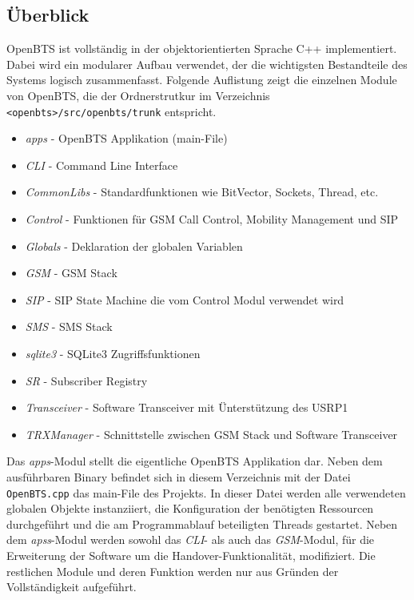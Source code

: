 \label{sec:swarch}

\subsection{Überblick}

OpenBTS ist vollständig in der objektorientierten Sprache C++ implementiert. Dabei wird ein modularer Aufbau verwendet, der die wichtigsten Bestandteile des Systems logisch zusammenfasst. Folgende Auflistung zeigt die einzelnen Module von OpenBTS, die der Ordnerstrutkur im Verzeichnis \lstinline{<openbts>/src/openbts/trunk} entspricht.

\begin{itemize}
 \item \textit{apps} - OpenBTS Applikation (main-File)
 \item \textit{CLI} - Command Line Interface
 \item \textit{CommonLibs} - Standardfunktionen wie BitVector, Sockets, Thread, etc.
 \item \textit{Control} - Funktionen für GSM Call Control, Mobility Management und SIP
 \item \textit{Globals} - Deklaration der globalen Variablen
 \item \textit{GSM} - GSM Stack
 \item \textit{SIP} - SIP State Machine die vom Control Modul verwendet wird
 \item \textit{SMS} - SMS Stack
 \item \textit{sqlite3} - SQLite3 Zugriffsfunktionen
 \item \textit{SR} - Subscriber Registry
 \item \textit{Transceiver} - Software Transceiver mit Ünterstützung des USRP1
 \item \textit{TRXManager} - Schnittstelle zwischen GSM Stack und Software Transceiver
\end{itemize}

Das \textit{apps}-Modul stellt die eigentliche OpenBTS Applikation dar. Neben dem ausführbaren Binary befindet sich in diesem Verzeichnis mit der Datei \lstinline{OpenBTS.cpp} das main-File des Projekts. In dieser Datei werden alle verwendeten globalen Objekte instanziiert, die Konfiguration der benötigten Ressourcen durchgeführt und die am Programmablauf beteiligten Threads gestartet. Neben dem \textit{apss}-Modul werden sowohl das \textit{CLI}- als auch das \textit{GSM}-Modul, für die Erweiterung der Software um die Handover-Funktionalität, modifiziert. Die restlichen Module und deren Funktion werden nur aus Gründen der Vollständigkeit aufgeführt.

